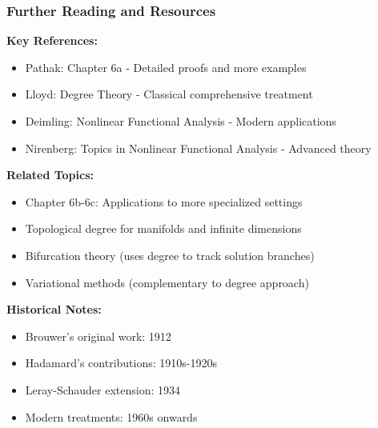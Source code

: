 \documentclass[aspectratio=169,10pt]{beamer}
\begin{document}
\begin{frame}
\frametitle{Further Reading and Resources}

\textbf{Key References:}
\begin{itemize}
    \item Pathak: Chapter 6a - Detailed proofs and more examples
    \item Lloyd: Degree Theory - Classical comprehensive treatment
    \item Deimling: Nonlinear Functional Analysis - Modern applications
    \item Nirenberg: Topics in Nonlinear Functional Analysis - Advanced theory
\end{itemize}

\vspace{0.3cm}
\textbf{Related Topics:}
\begin{itemize}
    \item Chapter 6b-6c: Applications to more specialized settings
    \item Topological degree for manifolds and infinite dimensions
    \item Bifurcation theory (uses degree to track solution branches)
    \item Variational methods (complementary to degree approach)
\end{itemize}

\vspace{0.3cm}
\textbf{Historical Notes:}
\begin{itemize}
    \item Brouwer's original work: 1912
    \item Hadamard's contributions: 1910s-1920s
    \item Leray-Schauder extension: 1934
    \item Modern treatments: 1960s onwards
\end{itemize}
\end{frame}
\end{document}
